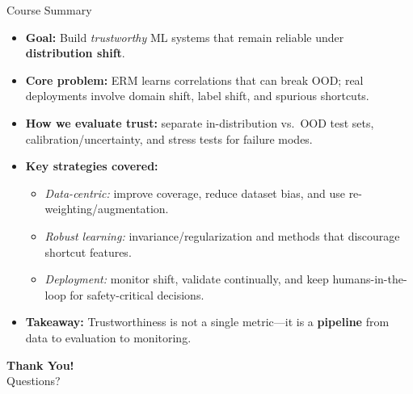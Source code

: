 \documentclass[aspectratio=169]{beamer}
\begin{document}
\begin{frame}{Course Summary}
    \begin{itemize}
        \item \textbf{Goal:} Build \textit{trustworthy} ML systems that remain reliable under \textbf{distribution shift}.
        \item \textbf{Core problem:} ERM learns correlations that can break OOD; real deployments involve domain shift, label shift, and spurious shortcuts.
        \item \textbf{How we evaluate trust:} separate in-distribution vs.\ OOD test sets, calibration/uncertainty, and stress tests for failure modes.
        \item \textbf{Key strategies covered:}
        \begin{itemize}
            \item \textit{Data-centric:} improve coverage, reduce dataset bias, and use re-weighting/augmentation.
            \item \textit{Robust learning:} invariance/regularization and methods that discourage shortcut features.
            \item \textit{Deployment:} monitor shift, validate continually, and keep humans-in-the-loop for safety-critical decisions.
        \end{itemize}
        \item \textbf{Takeaway:} Trustworthiness is not a single metric---it is a \textbf{pipeline} from data to evaluation to monitoring.
    \end{itemize}
\end{frame}

\begin{frame}
    \begin{center}
        \Huge \textbf{Thank You!} \\
        \vspace{1cm}
        \Large Questions?
    \end{center}
\end{frame}
\end{document}
